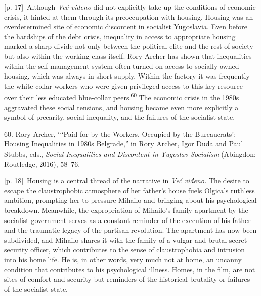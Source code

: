 \documentclass[10pt,a4paper]{article}
\begin{document}
{\scriptsize\color{gray} [p. 17]}\ Although \textit{Već viđeno} did not explicitly take up the conditions of economic crisis, it hinted at them through its preoccupation with housing. Housing was an overdetermined site of economic discontent in socialist Yugoslavia. Even before the hardships of the debt crisis, inequality in access to appropriate housing marked a sharp divide not only between the political elite and the rest of society but also within the working class itself. Rory Archer has shown that inequalities within the self-management system often turned on access to socially owned housing, which was always in short supply. Within the factory it was frequently the white-collar workers who were given privileged access to this key resource over their less educated blue-collar peers.\nobreak\textsuperscript{60} The economic crisis in the 1980s aggravated these social tensions, and housing became even more explicitly a symbol of precarity, social inequality, and the failures of the socialist state.\par{\small 60. Rory Archer, “‘Paid for by the Workers, Occupied by the Bureaucrats’: Housing Inequalities in 1980s Belgrade,” in Rory Archer, Igor Duda and Paul Stubbs, eds., \textit{Social Inequalities and Discontent in Yugoslav Socialism} (Abingdon: Routledge, 2016), 58–76.\par}
{\scriptsize\color{gray} [p. 18]}\ Housing is a central thread of the narrative in \textit{Već viđeno.} The desire to escape the claustrophobic atmosphere of her father’s house fuels Olgica’s ruthless ambition, prompting her to pressure Mihailo and bringing about his psychological breakdown. Meanwhile, the expropriation of Mihailo’s family apartment by the socialist government serves as a constant reminder of the execution of his father and the traumatic legacy of the partisan revolution. The apartment has now been subdivided, and Mihailo shares it with the family of a vulgar and brutal secret security officer, which contributes to the sense of claustrophobia and intrusion into his home life. He is, in other words, very much not at home, an uncanny condition that contributes to his psychological illness. Homes, in the film, are not sites of comfort and security but reminders of the historical brutality or failures of the socialist state.\par
\end{document}
